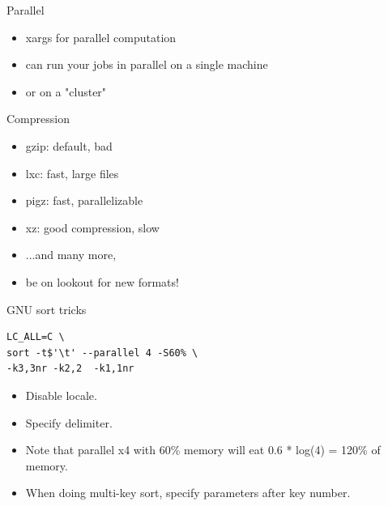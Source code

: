 \documentclass[handout]{beamer}
\begin{document}

\begin{frame}{Parallel}

\begin{itemize}
\item xargs for parallel computation
\item can run your jobs in parallel on a single machine
\item or on a "cluster"
\end{itemize}

\end{frame}


\begin{frame}{Compression}

\begin{itemize}
\item gzip: default, bad
\item lxc: fast, large files
\item pigz: fast, parallelizable
\item xz: good compression, slow
\item ...and many more,
\item be on lookout for new formats!
\end{itemize}

\end{frame}


\begin{frame}[fragile]{GNU sort tricks}

\begin{verbatim}
LC_ALL=C \
sort -t$'\t' --parallel 4 -S60% \
-k3,3nr -k2,2  -k1,1nr
\end{verbatim}

\begin{itemize}
\item Disable locale.
\item Specify delimiter.
\item Note that parallel x4 with 60\% memory
      will eat 0.6 * log(4) = 120\% of memory.
\item When doing multi-key sort, specify parameters after key number.
\end{itemize}

\end{frame}
\end{document}
